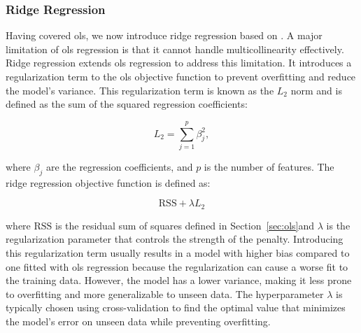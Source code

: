 \subsubsection{Ridge Regression}
Having covered \gls{ols}, we now introduce ridge regression based on \citet{James2023AnIS}.
A major limitation of \gls{ols} regression is that it cannot handle multicollinearity effectively.
Ridge regression extends \gls{ols} regression to address this limitation.
It introduces a regularization term to the \gls{ols} objective function to prevent overfitting and reduce the model's variance.
This regularization term is known as the $L_2$ norm and is defined as the sum of the squared regression coefficients:

$$
L_2 = \sum_{j=1}^{p} \beta_j^2,
$$

where $\beta_j$ are the regression coefficients, and $p$ is the number of features.
The ridge regression objective function is defined as:

$$
\text{RSS} + \lambda L_2
$$

where $\text{RSS}$ is the residual sum of squares defined in Section~\ref{sec:ols}and $\lambda$ is the regularization parameter that controls the strength of the penalty.
Introducing this regularization term usually results in a model with higher bias compared to one fitted with \gls{ols} regression because the regularization can cause a worse fit to the training data.
However, the model has a lower variance, making it less prone to overfitting and more generalizable to unseen data.
The hyperparameter $\lambda$ is typically chosen using cross-validation to find the optimal value that minimizes the model's error on unseen data while preventing overfitting.
